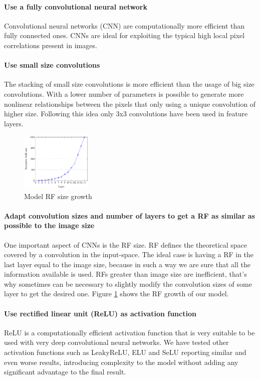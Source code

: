 \documentclass[preprint]{elsarticle}
\theoremstyle{definition} %
\theoremstyle{remark}
\begin{document}
\paragraph{Use a fully convolutional neural network} Convolutional neural networks (CNN) are computationally more efficient than fully connected ones. CNNs are ideal for exploiting the typical high local pixel correlations present in images.

\paragraph{Use small size convolutions} The stacking of small size convolutions is more efficient than the usage of big size convolutions. With a lower number of parameters is possible to generate more nonlinear relationships between the pixels that only using a unique convolution of higher size. Following this idea only 3x3 convolutions have been used in feature layers. 

\begin{figure}
	\centering
	\includegraphics[width=0.30\textwidth]{figures/receptive-field-640.pdf}
	\caption{Model RF size growth}
	\label{fig:rf_graph}
\end{figure}

\paragraph{Adapt convolution sizes and number of layers to get a RF as similar as possible to the image size} One important aspect of CNNs is the RF size. RF defines the theoretical space covered by a convolution in the input-space. The ideal case is having a RF in the last layer equal to the image size, because in such a way we are sure that all the information available is used. RFs greater than image size are inefficient, that's why sometimes can be necessary to slightly modify the convolution sizes of some layer to get the desired one. Figure \ref{fig:rf_graph} shows the RF growth of our model.

\paragraph{Use rectified linear unit (ReLU) as activation function} ReLU is a computationally efficient activation function that is very suitable to be used with very deep convolutional neural networks\cite{Dahl2013}. We have tested other activation functions such as LeakyReLU, ELU and SeLU reporting similar and even worse results, introducing complexity to the model without adding any significant advantage to the final result.
\end{document}
